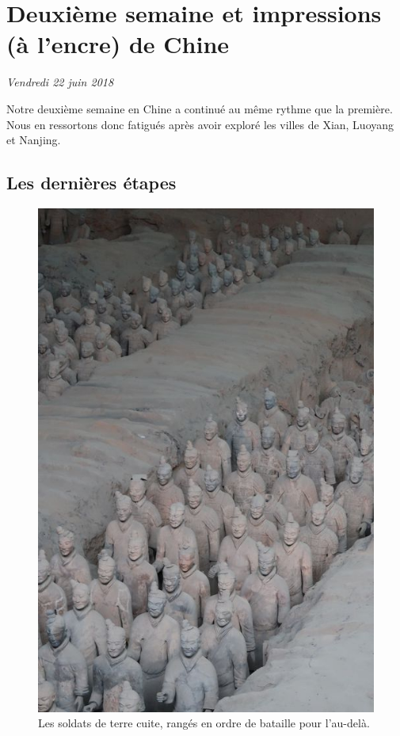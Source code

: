 \hypertarget{deuxiuxe8me-semaine-et-impressions-uxe0-lencre-de-chine}{%
\section{Deuxième semaine et impressions (à l'encre) de
Chine}\label{deuxiuxe8me-semaine-et-impressions-uxe0-lencre-de-chine}}

\emph{Vendredi 22 juin 2018}

Notre deuxième semaine en Chine a continué au même rythme que la
première. Nous en ressortons donc fatigués après avoir exploré les
villes de Xian, Luoyang et Nanjing.

\hypertarget{les-derniuxe8res-uxe9tapes}{%
\subsection{Les dernières étapes}\label{les-derniuxe8res-uxe9tapes}}

\begin{figure}
\centering
\includegraphics{images/20180622_terracotta.JPG}
\caption{Les soldats de terre cuite, rangés en ordre de bataille pour
l'au-delà.}
\end{figure}

